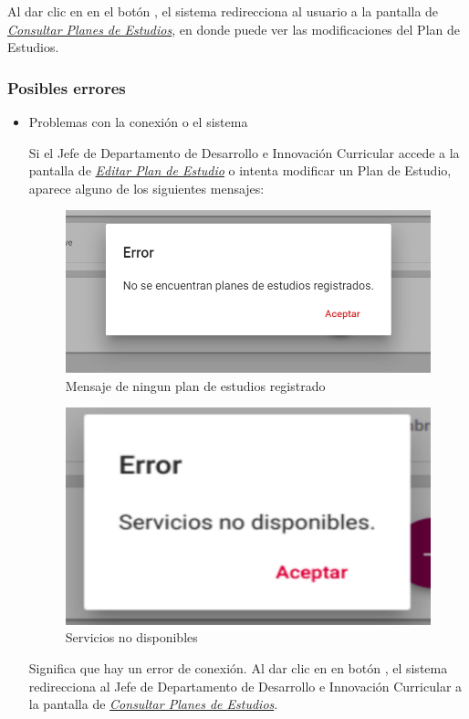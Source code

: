 Al dar clic en en el botón  , el sistema redirecciona al usuario a la pantalla de \hyperlink{consultarPE}{\textit{Consultar Planes de Estudios}}, en donde puede ver las modificaciones del Plan de Estudios.\\
\newpage
\subsubsection{Posibles errores}

\begin{itemize}
	\item Problemas con la conexión o el sistema

	Si el Jefe de Departamento de Desarrollo e Innovación Curricular accede a la pantalla de \hyperlink{editarPE}{\textit{Editar Plan de Estudio}} o intenta modificar un Plan de Estudio, aparece alguno de los siguientes mensajes:

	\begin{figure}[!hbtp]
		\centering
		\hypertarget{ms3}{\includegraphics[width=0.7\linewidth]{images/SP4-GPE/m3}}
		\caption{Mensaje de ningun plan de estudios registrado}
		\label{ms3}
	\end{figure}
	\begin{figure}[!hbtp]
		\centering
		\hypertarget{error}{\includegraphics[width=0.7\linewidth]{images/SP4-GPE/error}}
		\caption{Servicios no disponibles}
		\label{error}
	\end{figure}


	Significa que hay un error de conexión. Al dar clic en en botón  , el sistema redirecciona al Jefe de Departamento de Desarrollo e Innovación Curricular a la pantalla de \hyperlink{consultarPE}{\textit{Consultar Planes de Estudios}}. 
	\newpage


\end{itemize}
